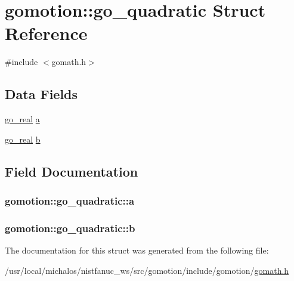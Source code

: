 \hypertarget{structgomotion_1_1go__quadratic}{\section{gomotion\-:\-:go\-\_\-quadratic Struct Reference}
\label{structgomotion_1_1go__quadratic}
}


{\ttfamily \#include $<$gomath.\-h$>$}

\subsection*{Data Fields}
\begin{DoxyCompactItemize}
\item 
\hyperlink{gotypes_8h_afd666a2393eebd71ee455846ac9def9b}{go\-\_\-real} \hyperlink{structgomotion_1_1go__quadratic_a6c7ae9e2f77e687015fc736848971e5c}{a}
\item 
\hyperlink{gotypes_8h_afd666a2393eebd71ee455846ac9def9b}{go\-\_\-real} \hyperlink{structgomotion_1_1go__quadratic_ae06e4da9f9ffdf7a19149dcf40b92073}{b}
\end{DoxyCompactItemize}


\subsection{Field Documentation}
\hypertarget{structgomotion_1_1go__quadratic_a6c7ae9e2f77e687015fc736848971e5c}{
\subsubsection[{a}]{ gomotion\-::go\-\_\-quadratic\-::a}}\label{structgomotion_1_1go__quadratic_a6c7ae9e2f77e687015fc736848971e5c}
\hypertarget{structgomotion_1_1go__quadratic_ae06e4da9f9ffdf7a19149dcf40b92073}{
\subsubsection[{b}]{ gomotion\-::go\-\_\-quadratic\-::b}}\label{structgomotion_1_1go__quadratic_ae06e4da9f9ffdf7a19149dcf40b92073}


The documentation for this struct was generated from the following file\-:\begin{DoxyCompactItemize}
\item 
/usr/local/michalos/nistfanuc\-\_\-ws/src/gomotion/include/gomotion/\hyperlink{gomath_8h}{gomath.\-h}\end{DoxyCompactItemize}
